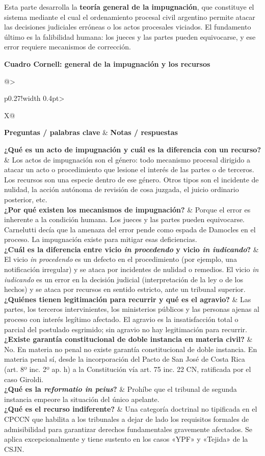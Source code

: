 \documentclass[12pt,oneside]{book}
\makeatletter
\newcommand{\cornelltitle}[1]{\par\bigskip\noindent\textbf{\sffamily Cuadro Cornell: #1}\par\nopagebreak\smallskip}
\newcommand{\cqrow}[2]{\textbf{#1} & #2 \\[0.5em]}
\newcommand{\cornellblock}[1]{%
  \noindent\begin{tabularx}{\textwidth}{@{}>{\raggedright\arraybackslash}p{0.27\textwidth}!{\vrule width 0.4pt}>{\raggedright\arraybackslash}X@{}}
  \toprule
  \textbf{Preguntas / palabras clave} & \textbf{Notas / respuestas} \\
  \midrule
  #1
  \bottomrule
  \end{tabularx}\par}
\makeatother
\begin{document}
\begin{important}
Esta parte desarrolla la \textbf{teoría general de la impugnación}, que constituye el sistema mediante el cual el ordenamiento procesal civil argentino permite atacar las decisiones judiciales erróneas o los actos procesales viciados. El fundamento último es la falibilidad humana: los jueces y las partes pueden equivocarse, y ese error requiere mecanismos de corrección.
\end{important}

\cornelltitle{general de la impugnación y los recursos}
\cornellblock{
\cqrow{¿Qué es un acto de impugnación y cuál es la diferencia con un recurso?}{Los actos de impugnación son el género: todo mecanismo procesal dirigido a atacar un acto o procedimiento que lesione el interés de las partes o de terceros. Los recursos son una especie dentro de ese género. Otros tipos son el incidente de nulidad, la acción autónoma de revisión de cosa juzgada, el juicio ordinario posterior, etc.
}
\cqrow{¿Por qué existen los mecanismos de impugnación?}{Porque el error es inherente a la condición humana. Los jueces y las partes pueden equivocarse. Carnelutti decía que la amenaza del error pende como espada de Damocles en el proceso. La impugnación existe para mitigar esas deficiencias.
}
\cqrow{¿Cuál es la diferencia entre vicio \textit{in procedendo} y vicio \textit{in iudicando}?}{El vicio \textit{in procedendo} es un defecto en el procedimiento (por ejemplo, una notificación irregular) y se ataca por incidentes de nulidad o remedios. El vicio \textit{in iudicando} es un error en la decisión judicial (interpretación de la ley o de los hechos) y se ataca por recursos en sentido estricto, ante un tribunal superior.
}
\cqrow{¿Quiénes tienen legitimación para recurrir y qué es el agravio?}{Las partes, los terceros intervinientes, los ministerios públicos y las personas ajenas al proceso con interés legítimo afectado. El agravio es la insatisfacción total o parcial del postulado esgrimido; sin agravio no hay legitimación para recurrir.
}
\cqrow{¿Existe garantía constitucional de doble instancia en materia civil?}{No. En materia no penal no existe garantía constitucional de doble instancia. En materia penal sí, desde la incorporación del Pacto de San José de Costa Rica (art. 8º inc. 2º ap. h) a la Constitución vía art. 75 inc. 22 CN, ratificada por el caso Giroldi.
}
\cqrow{¿Qué es la \textit{reformatio in peius}?}{Prohíbe que el tribunal de segunda instancia empeore la situación del único apelante.
}
\cqrow{¿Qué es el recurso indiferente?}{Una categoría doctrinal no tipificada en el CPCCN que habilita a los tribunales a dejar de lado los requisitos formales de admisibilidad para garantizar derechos fundamentales gravemente afectados. Se aplica excepcionalmente y tiene sustento en los casos «YPF» y «Tejida» de la CSJN.
}
}
\end{document}
